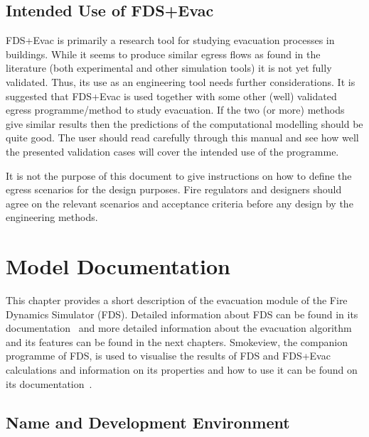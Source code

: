 \documentclass[12pt,a4paper,final,twoside]{stylevk}
\begin{document}
\section{Intended Use of FDS+Evac}\label{Sec_IntUsers}


\noindent FDS+Evac is primarily a research tool for studying
evacuation processes in buildings.  While it seems to produce similar
egress flows as found in the literature (both experimental and other
simulation tools) it is not yet fully validated.  Thus, its use as an
engineering tool needs further considerations.  It is suggested that
FDS+Evac is used together with some other (well) validated egress
programme/method to study evacuation.  If the two (or more) methods
give similar results then the predictions of the computational
modelling should be quite good.  The user should read carefully
through this manual and see how well the presented validation cases
will cover the intended use of the programme.

It is not the purpose of this document to give instructions on how to
define the egress scenarios for the design purposes.  Fire regulators
and designers should agree on the relevant scenarios and acceptance
criteria before any design by the engineering methods.

\clearpage

\newpage


\chapter{Model Documentation}\label{Sec_ModelDef}

\noindent This chapter provides a short description of the evacuation
module of the Fire Dynamics Simulator (FDS).  Detailed information
about FDS can be found in its documentation~\cite{FDS_Manual,
  FDS_UserGuide, FDS_VVGuide1, FDS_VVGuide2} and more detailed
information about the evacuation algorithm and its features can be
found in the next chapters.  Smokeview, the companion programme of
FDS, is used to visualise the results of FDS and FDS+Evac calculations
and information on its properties and how to use it can be found on
its documentation~\cite{SV_UserGuide, SV_TechGuide, SV_VVGuide}.


\section{Name and Development Environment}
\end{document}
